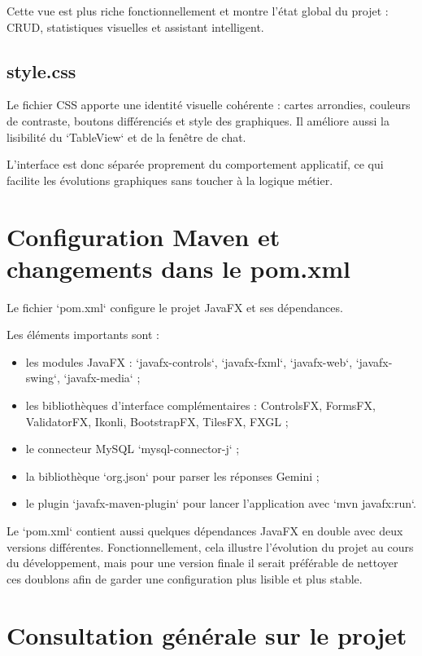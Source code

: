 \documentclass[11pt,a4paper]{article}
\begin{document}
Cette vue est plus riche fonctionnellement et montre l'état global du projet : CRUD, statistiques visuelles et assistant intelligent.

\subsection{style.css}

Le fichier CSS apporte une identité visuelle cohérente : cartes arrondies, couleurs de contraste, boutons différenciés et style des graphiques. Il améliore aussi la lisibilité du `TableView` et de la fenêtre de chat.

L'interface est donc séparée proprement du comportement applicatif, ce qui facilite les évolutions graphiques sans toucher à la logique métier.

\section{Configuration Maven et changements dans le pom.xml}

Le fichier `pom.xml` configure le projet JavaFX et ses dépendances.

Les éléments importants sont :
\begin{itemize}[leftmargin=1.4em]
    \item les modules JavaFX : `javafx-controls`, `javafx-fxml`, `javafx-web`, `javafx-swing`, `javafx-media` ;
    \item les bibliothèques d'interface complémentaires : ControlsFX, FormsFX, ValidatorFX, Ikonli, BootstrapFX, TilesFX, FXGL ;
    \item le connecteur MySQL `mysql-connector-j` ;
    \item la bibliothèque `org.json` pour parser les réponses Gemini ;
    \item le plugin `javafx-maven-plugin` pour lancer l'application avec `mvn javafx:run`.
\end{itemize}

Le `pom.xml` contient aussi quelques dépendances JavaFX en double avec deux versions différentes. Fonctionnellement, cela illustre l'évolution du projet au cours du développement, mais pour une version finale il serait préférable de nettoyer ces doublons afin de garder une configuration plus lisible et plus stable.

\section{Consultation générale sur le projet}
\end{document}

